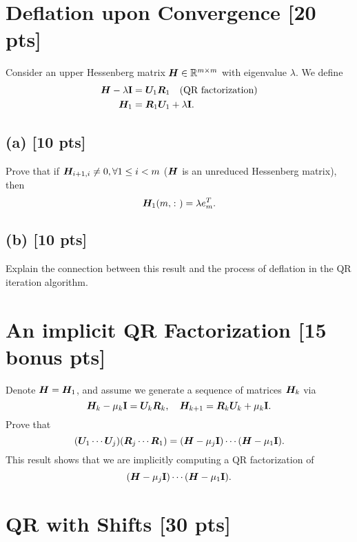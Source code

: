 \documentclass[twoside,10pt]{article}
\begin{document}
\section{Deflation upon Convergence [20 pts]}
Consider an upper Hessenberg matrix $\bm{H} \in \mathbb{R}^{m \times m}$ with eigenvalue $\lambda$. 
We define 
\begin{align}
  \bm{H} - \lambda \mathbf{I} &= \bm{U}_1 \bm{R}_1 \quad \text{(QR factorization)} \\ 
  \bm{H}_1 &= \bm{R}_1 \bm{U}_1 + \lambda \mathbf{I}.
\end{align}

\subsection*{(a) [10 pts]}
Prove that if $\bm{H}_{i + 1, i} \neq  0, \forall 1 \leq i < m$ ($\bm{H}$ is an unreduced Hessenberg matrix), then 
\begin{equation}
  \mtx{H}_1\left(m, \colon\right) = \lambda e_m^{T}. 
\end{equation}

\subsection*{(b) [10 pts]}
Explain the connection between this result and the process of deflation in the QR iteration algorithm. 

\section{An implicit QR Factorization [15 bonus pts]}
Denote $\bm{H} = \bm{H}_1$, and assume we generate a sequence of matrices $\bm{H}_k$ via 
\begin{equation}
  \bm{H}_k - \mu_k \mathbf{I} = \bm{U}_k \bm{R}_k, \quad \bm{H}_{k + 1} = \bm{R}_k \bm{U}_k + \mu_k \mathbf{I}. 
\end{equation}
Prove that 
\begin{equation}
  \left(\mtx{U}_1 \cdots \mtx{U}_j\right)\left(\mtx{R}_j \cdots \mtx{R}_1\right) = \left(\mtx{H} - \mu_{j} \Id\right) \cdots \left(\mtx{H} - \mu_1 \Id\right). 
\end{equation}
This result shows that we are implicitly computing a QR factorization of 
\begin{equation}
  \left(\mtx{H} - \mu_j \Id\right) \cdots \left(\mtx{H} - \mu_1 \Id\right).   
\end{equation}

\section{QR with Shifts [30 pts]}
\end{document}
